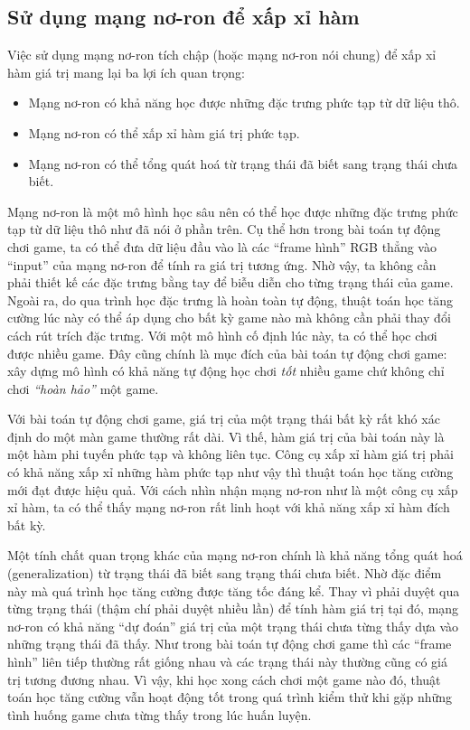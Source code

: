 \subsection{Sử dụng mạng nơ-ron để xấp xỉ hàm}
	Việc sử dụng mạng nơ-ron tích chập (hoặc mạng nơ-ron nói chung) để xấp xỉ hàm giá trị mang lại ba lợi ích quan trọng:
	\begin{itemize}
		\item Mạng nơ-ron có khả năng học được những đặc trưng phức tạp từ dữ liệu thô.
		\item Mạng nơ-ron có thể xấp xỉ hàm giá trị phức tạp.
		\item Mạng nơ-ron có thể tổng quát hoá từ trạng thái đã biết sang trạng thái chưa biết.
	\end{itemize}
	
	Mạng nơ-ron là một mô hình học sâu nên có thể học được những đặc trưng phức tạp từ dữ liệu thô như đã nói ở phần trên.
	Cụ thể hơn trong bài toán tự động chơi game, ta có thể đưa dữ liệu đầu vào là các ``frame hình'' RGB thẳng vào ``input'' của mạng nơ-ron để tính ra giá trị tương ứng.
	Nhờ vậy, ta không cần phải thiết kế các đặc trưng bằng tay để biễu diễn cho từng trạng thái của game.
	Ngoài ra, do qua trình học đặc trưng là hoàn toàn tự động, thuật toán học tăng cường lúc này có thể áp dụng cho bất kỳ game nào mà không cần phải thay đổi cách rút trích đặc trưng.
	Với một mô hình cố định lúc này, ta có thể học chơi được nhiều game.
	Đây cũng chính là mục đích của bài toán tự động chơi game: xây dựng mô hình có khả năng tự động học chơi \textit{tốt} nhiều game chứ không chỉ chơi \textit{``hoàn hảo''} một game.
	
	Với bài toán tự động chơi game, giá trị của một trạng thái bất kỳ rất khó xác định do một màn game thường rất dài.
	Vì thế, hàm giá trị của bài toán này là một hàm phi tuyến phức tạp và không liên tục.
	Công cụ xấp xỉ hàm giá trị phải có khả năng xấp xỉ những hàm phức tạp như vậy thì thuật toán học tăng cường mới đạt được hiệu quả.
	Với cách nhìn nhận mạng nơ-ron như là một công cụ xấp xỉ hàm, ta có thể thấy mạng nơ-ron rất linh hoạt với khả năng xấp xỉ hàm đích bất kỳ.
	
	Một tính chất quan trọng khác của mạng nơ-ron chính là khả năng tổng quát hoá (generalization) từ trạng thái đã biết sang trạng thái chưa biết.
	Nhờ đặc điểm này mà quá trình học tăng cường được tăng tốc đáng kể.
	Thay vì phải duyệt qua từng trạng thái (thậm chí phải duyệt nhiều lần) để tính hàm giá trị tại đó, mạng nơ-ron có khả năng ``dự đoán'' giá trị của một trạng thái chưa từng thấy dựa vào những trạng thái đã thấy.
	Như trong bài toán tự động chơi game thì các ``frame hình'' liên tiếp thường rất giống nhau và các trạng thái này thường cũng có giá trị tương đương nhau.
	Vì vậy, khi học xong cách chơi một game nào đó, thuật toán học tăng cường vẫn hoạt động tốt trong quá trình kiểm thử khi gặp những tình huống game chưa từng thấy trong lúc huấn luyện.
	
